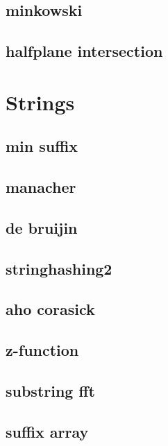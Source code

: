 \subsection{minkowski}
\raggedbottom
\hrulefill
\subsection{halfplane intersection}
\raggedbottom
\hrulefill

\section{Strings}
\subsection{min suffix}
\raggedbottom
\hrulefill
\subsection{manacher}
\raggedbottom
\hrulefill
\subsection{de bruijin}
\raggedbottom
\hrulefill
\subsection{stringhashing2}
\raggedbottom
\hrulefill
\subsection{aho corasick}
\raggedbottom
\hrulefill
\subsection{z-function}
\raggedbottom
\hrulefill
\subsection{substring fft}
\raggedbottom
\hrulefill
\subsection{suffix array}
\raggedbottom
\hrulefill
